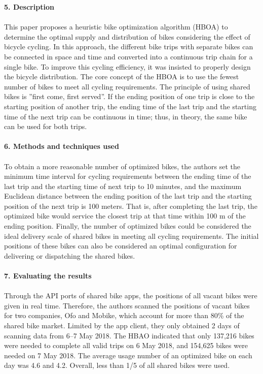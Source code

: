 \documentclass[a4paper]{article}
\begin{document}
\textbf{5. Description}
\ \\ \ \\
This paper proposes a heuristic bike
optimization algorithm (HBOA) to determine the optimal supply and distribution of bikes considering
the effect of bicycle cycling. In this approach, the different bike trips with separate bikes can be
connected in space and time and converted into a continuous trip chain for a single bike. To improve
this cycling efficiency, it was insisted to properly design the bicycle distribution. The core concept of the HBOA is to use the fewest number of bikes to meet all
cycling requirements. The principle of using shared bikes is ”first come, first served”. If the ending
position of one trip is close to the starting position of another trip, the ending time of the last trip and
the starting time of the next trip can be continuous in time; thus, in theory, the same bike can be used
for both trips.
\ \\ \ \\
\textbf{6. Methods and techniques used}
\ \\ \ \\
To obtain a more reasonable number of optimized bikes, the authors set the minimum time interval for
cycling requirements between the ending time of the last trip and the starting time of next trip to 10
minutes, and the maximum Euclidean distance between the ending position of the last trip and the
starting position of the next trip is 100 meters. That is, after completing the last trip, the optimized
bike would service the closest trip at that time within 100 m of the ending position. Finally, the
number of optimized bikes could be considered the ideal delivery scale of shared bikes in meeting all
cycling requirements. The initial positions of these bikes can also be considered an optimal
configuration for delivering or dispatching the shared bikes.
\ \\ \ \\
\textbf{7. Evaluating the results}
\ \\ \ \\
Through the API ports of shared bike apps, the positions of all vacant bikes were given in real
time. Therefore, the authors scanned the positions of vacant bikes for two companies, Ofo and Mobike, which
account for more than 80\% of the shared bike market. Limited by the app client, they only obtained 2
days of scanning data from 6–7 May 2018. The HBAO indicated that only 137,216 bikes were needed to complete all valid trips on 6 May
2018, and 154,625 bikes were needed on 7 May 2018. The average usage number of an optimized bike
on each day was 4.6 and 4.2. Overall, less than 1/5 of all shared bikes were used.
\end{document}

